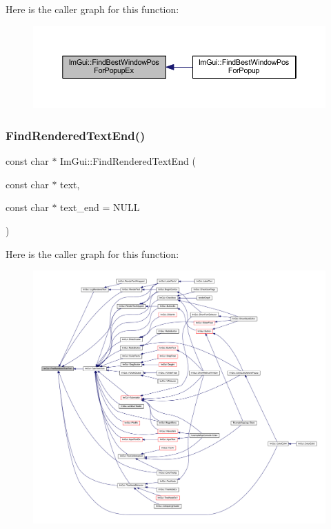 Here is the caller graph for this function\+:
\nopagebreak
\begin{figure}[H]
\begin{center}
\leavevmode
\includegraphics[width=350pt]{namespace_im_gui_a4159d978951d11bb8be459911ae58db2_icgraph}
\end{center}
\end{figure}
\mbox{\label{namespace_im_gui_a7671e1dbc803a31b06081b52a771d83f}} 
\subsubsection{\texorpdfstring{Find\+Rendered\+Text\+End()}{FindRenderedTextEnd()}}
{\footnotesize\ttfamily const char $\ast$ Im\+Gui\+::\+Find\+Rendered\+Text\+End (\begin{DoxyParamCaption}\item[{const char $\ast$}]{text,  }\item[{const char $\ast$}]{text\+\_\+end = {\ttfamily NULL} }\end{DoxyParamCaption})}

Here is the caller graph for this function\+:
\nopagebreak
\begin{figure}[H]
\begin{center}
\leavevmode
\includegraphics[width=350pt]{namespace_im_gui_a7671e1dbc803a31b06081b52a771d83f_icgraph}
\end{center}
\end{figure}
\mbox{\label{namespace_im_gui_ad9e15440c52f63aa96ef3b3938d566f8}} 
